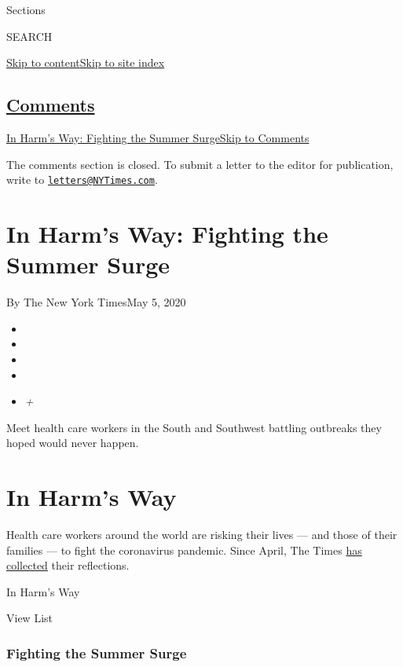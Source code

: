 Sections

SEARCH

\protect\hyperlink{site-content}{Skip to
content}\protect\hyperlink{site-index}{Skip to site index}

\hypertarget{comments}{%
\subsection{\texorpdfstring{\protect\hyperlink{commentsContainer}{Comments}}{Comments}}\label{comments}}

\href{}{In Harm's Way: Fighting the Summer Surge}\href{}{Skip to
Comments}

The comments section is closed. To submit a letter to the editor for
publication, write to
\href{mailto:letters@NYTimes.com}{\nolinkurl{letters@NYTimes.com}}.

\hypertarget{in-harms-way-fighting-the-summer-surge}{%
\section{In Harm's Way: Fighting the Summer
Surge}\label{in-harms-way-fighting-the-summer-surge}}

By The New York TimesMay 5, 2020

\begin{itemize}
\item
\item
\item
\item
\item
  \emph{+}
\end{itemize}

Meet health care workers in the South and Southwest battling outbreaks
they hoped would never happen.

\hypertarget{in-harms-way}{%
\section{In Harm's Way}\label{in-harms-way}}

Health care workers around the world are risking their lives --- and
those of their families --- to fight the coronavirus pandemic. Since
April, The Times
\href{https://www.nytimes3xbfgragh.onion/article/doctors-treating-coronavirus.html}{has
collected} their reflections.

In Harm's Way

View List

\hypertarget{fighting-the-summer-surge}{%
\subsubsection{Fighting the Summer
Surge}\label{fighting-the-summer-surge}}

